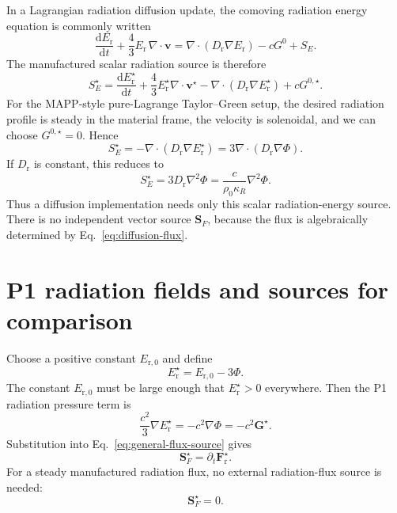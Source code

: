 \documentclass[11pt]{article}
\newcommand{\dd}{\mathrm{d}}
\newcommand{\Div}{\nabla\!\cdot}
\newcommand{\Grad}{\nabla}
\newcommand{\Er}{E_{\mathrm r}}
\newcommand{\Fr}{\bm{F}_{\mathrm r}}
\newcommand{\Gmom}{\bm{G}}
\newcommand{\Gzero}{G^0}
\newcommand{\ShatE}{S_E}
\newcommand{\ShatF}{\bm{S}_F}
\newcommand{\Erzero}{E_{\mathrm r,0}}
\newcommand{\Ddiff}{D_{\mathrm r}}
\begin{document}
In a Lagrangian radiation diffusion update, the comoving radiation energy
equation is commonly written
\begin{equation}
  \frac{\dd\Er}{\dd t}
  + \frac{4}{3}\Er\,\Div\bm{v}
  =
  \Div(\Ddiff\Grad\Er)
  - c\Gzero
  + \ShatE.
  \label{eq:diffusion-energy}
\end{equation}
The manufactured scalar radiation source is therefore
\begin{equation}
  \ShatE^\star
  =
  \frac{\dd\Er^\star}{\dd t}
  + \frac{4}{3}\Er^\star\Div\bm{v}^\star
  - \Div(\Ddiff\Grad\Er^\star)
  + cG^{0,\star}.
  \label{eq:diffusion-source-general}
\end{equation}
For the MAPP-style pure-Lagrange Taylor--Green setup, the desired radiation
profile is steady in the material frame, the velocity is solenoidal, and we
can choose \(G^{0,\star}=0\).  Hence
\begin{equation}
  \boxed{
  \ShatE^\star
  =
  -\Div(\Ddiff\Grad\Er^\star)
  =
  3\Div(\Ddiff\Grad\Phi).
  }
  \label{eq:diffusion-source-potential}
\end{equation}
If \(\Ddiff\) is constant, this reduces to
\begin{equation}
  \boxed{
  \ShatE^\star = 3\Ddiff\nabla^2\Phi
  = \frac{c}{\rho_0\kappa_R}\nabla^2\Phi.
  }
  \label{eq:diffusion-source-constant-d}
\end{equation}
Thus a diffusion implementation needs only this scalar radiation-energy
source.  There is no independent vector source \(\ShatF\), because the flux is
algebraically determined by Eq.~\eqref{eq:diffusion-flux}.

\section{P1 radiation fields and sources for comparison}

Choose a positive constant \(\Erzero\) and define
\begin{equation}
  \Er^\star = \Erzero - 3\Phi.
  \label{eq:erad-choice}
\end{equation}
The constant \(\Erzero\) must be large enough that \(\Er^\star>0\) everywhere.
Then the P1 radiation pressure term is
\begin{equation}
  \frac{c^2}{3}\Grad\Er^\star
  =
  -c^2\Grad\Phi
  =
  -c^2\Gmom^\star.
  \label{eq:p1-cancellation}
\end{equation}
Substitution into Eq.~\eqref{eq:general-flux-source} gives
\begin{equation}
  \ShatF^\star = \partial_t\Fr^\star.
  \label{eq:sflux-reduced}
\end{equation}
For a steady manufactured radiation flux, no external radiation-flux source is
needed:
\begin{equation}
  \boxed{\ShatF^\star=0.}
  \label{eq:sflux-zero}
\end{equation}
\end{document}
